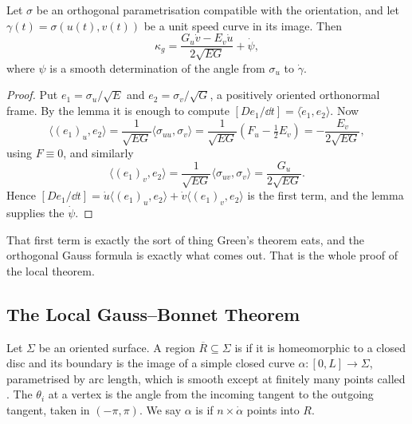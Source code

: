 \begin{proposition}
    Let $\sigma$ be an orthogonal parametrisation compatible with the orientation, and let $\gamma(t) = \sigma(u(t),v(t))$ be a unit speed curve in its image. Then
    $$
    \kappa_g = \frac{G_u \dot v - E_v \dot u}{2\sqrt{EG}} + \dot\psi,
    $$
    where $\psi$ is a smooth determination of the angle from $\sigma_u$ to $\dot\gamma$.
\end{proposition}
\begin{proof}
    Put $e_1 = \sigma_u/\sqrt E$ and $e_2 = \sigma_v/\sqrt G$, a positively oriented orthonormal frame. By the lemma it is enough to compute $[De_1/\dd t] = \langle \dot e_1, e_2\rangle$. Now
    $$
    \langle (e_1)_u, e_2\rangle = \frac{1}{\sqrt{EG}}\langle \sigma_{uu},\sigma_v\rangle = \frac{1}{\sqrt{EG}}\left(F_u - \tfrac12 E_v\right) = -\frac{E_v}{2\sqrt{EG}},
    $$
    using $F \equiv 0$, and similarly
    $$
    \langle (e_1)_v, e_2\rangle = \frac{1}{\sqrt{EG}}\langle\sigma_{uv},\sigma_v\rangle = \frac{G_u}{2\sqrt{EG}}.
    $$
    Hence $[De_1/\dd t] = \dot u\langle (e_1)_u,e_2\rangle + \dot v\langle (e_1)_v,e_2\rangle$ is the first term, and the lemma supplies the $\dot\psi$.
\end{proof}

That first term is exactly the sort of thing Green's theorem eats, and the orthogonal Gauss formula is exactly what comes out. That is the whole proof of the local theorem.

\subsection{The Local Gauss--Bonnet Theorem}

\begin{definition}
    Let $\Sigma$ be an oriented surface. A region $\overline R \subseteq \Sigma$ is  if it is homeomorphic to a closed disc and its boundary is the image of a simple closed curve $\alpha: [0,L] \rightarrow \Sigma$, parametrised by arc length, which is smooth except at finitely many points called . The  $\theta_i$ at a vertex is the angle from the incoming tangent to the outgoing tangent, taken in $(-\pi,\pi)$. We say $\alpha$ is  if $n \times \dot\alpha$ points into $R$.
\end{definition}


